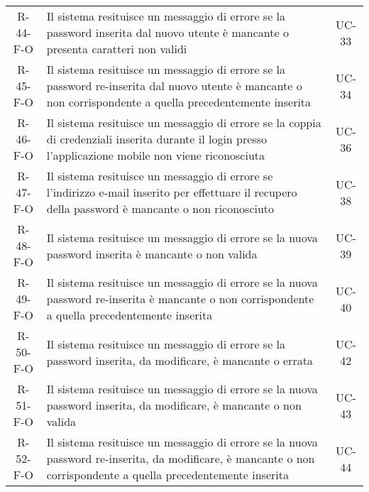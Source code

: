 \begin{longtable}{ c C{9.5cm} c }
    R-44-F-O & Il sistema resituisce un messaggio di errore se la password inserita dal nuovo utente è mancante o presenta caratteri non validi& UC-33\\
    R-45-F-O & Il sistema resituisce un messaggio di errore se la password re-inserita dal nuovo utente è mancante o non corrispondente a quella precedentemente inserita& UC-34\\
    R-46-F-O & Il sistema resituisce un messaggio di errore se la coppia di credenziali inserita durante il login presso l'applicazione mobile non viene riconosciuta& UC-36\\
    R-47-F-O & Il sistema resituisce un messaggio di errore se l'indirizzo e-mail inserito per effettuare il recupero della password è mancante o non riconosciuto& UC-38\\
    R-48-F-O & Il sistema resituisce un messaggio di errore se la nuova password inserita è mancante o non valida& UC-39\\
    R-49-F-O & Il sistema resituisce un messaggio di errore se la nuova password re-inserita è mancante o non corrispondente a quella precedentemente inserita& UC-40\\
    R-50-F-O & Il sistema resituisce un messaggio di errore se la password inserita, da modificare, è mancante o errata& UC-42\\
    R-51-F-O & Il sistema resituisce un messaggio di errore se la nuova password inserita, da modificare, è mancante o non valida& UC-43\\
    R-52-F-O & Il sistema resituisce un messaggio di errore se la nuova password re-inserita, da modificare, è mancante o non corrispondente a quella precedentemente inserita& UC-44\\

\end{longtable}